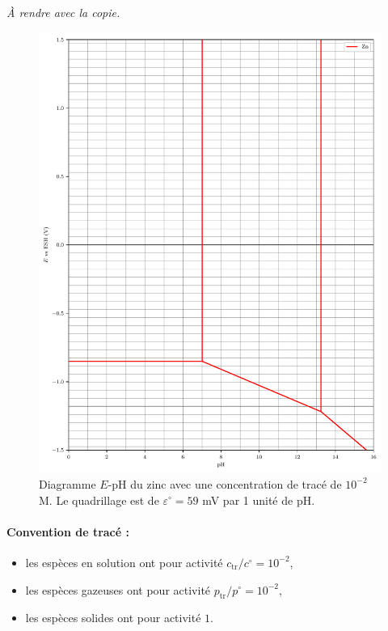 \begin{nopagebreak}
     \textsl{\`A rendre avec la copie.}
    
    \begin{figure}[H]
        \centering
        \includegraphics[width = \linewidth]{chimiePC/gene/E-pH-Zn.pdf}
        \caption{Diagramme $E$-pH du zinc avec une concentration de tracé de $10^{-2}$ M. \protect\linebreak
        Le quadrillage est de $\varepsilon^\circ = 59$ mV par 1 unité de pH.}
        \label{fig:EpHCu}
    \end{figure}
    
    \paragraph{Convention de tracé :}
\begin{itemize}
    \item les espèces en solution ont pour activité $c_\text{tr}/c^\circ = 10^{-2}$,
    \item les espèces gazeuses ont pour activité $p_\text{tr}/p^\circ = 10^{-2}$,
    \item les espèces solides ont pour activité $1$.
\end{itemize}

\end{nopagebreak}


